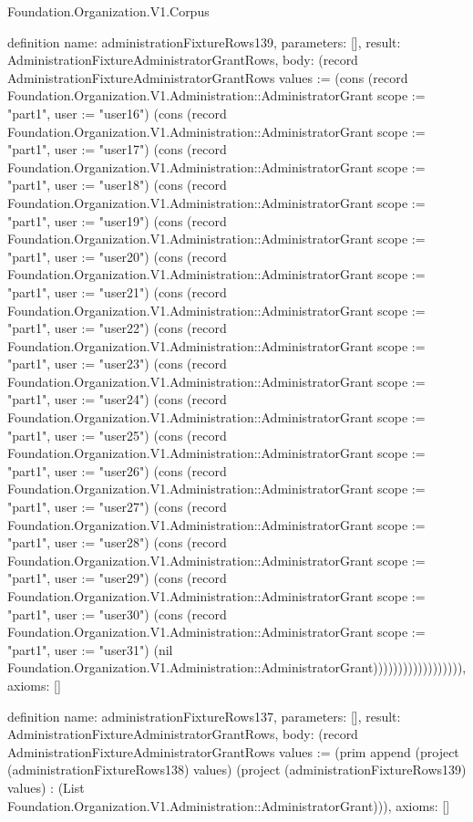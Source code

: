 \begin{lexlean}{Foundation.Organization.V1.Corpus}
\begin{semanticmodule}
definition{
  name: administrationFixtureRows139,
  parameters: [],
  result: AdministrationFixtureAdministratorGrantRows,
  body: (record AdministrationFixtureAdministratorGrantRows {values := (cons (record Foundation.Organization.V1.Administration::AdministratorGrant {scope := "part1", user := "user16"}) (cons (record Foundation.Organization.V1.Administration::AdministratorGrant {scope := "part1", user := "user17"}) (cons (record Foundation.Organization.V1.Administration::AdministratorGrant {scope := "part1", user := "user18"}) (cons (record Foundation.Organization.V1.Administration::AdministratorGrant {scope := "part1", user := "user19"}) (cons (record Foundation.Organization.V1.Administration::AdministratorGrant {scope := "part1", user := "user20"}) (cons (record Foundation.Organization.V1.Administration::AdministratorGrant {scope := "part1", user := "user21"}) (cons (record Foundation.Organization.V1.Administration::AdministratorGrant {scope := "part1", user := "user22"}) (cons (record Foundation.Organization.V1.Administration::AdministratorGrant {scope := "part1", user := "user23"}) (cons (record Foundation.Organization.V1.Administration::AdministratorGrant {scope := "part1", user := "user24"}) (cons (record Foundation.Organization.V1.Administration::AdministratorGrant {scope := "part1", user := "user25"}) (cons (record Foundation.Organization.V1.Administration::AdministratorGrant {scope := "part1", user := "user26"}) (cons (record Foundation.Organization.V1.Administration::AdministratorGrant {scope := "part1", user := "user27"}) (cons (record Foundation.Organization.V1.Administration::AdministratorGrant {scope := "part1", user := "user28"}) (cons (record Foundation.Organization.V1.Administration::AdministratorGrant {scope := "part1", user := "user29"}) (cons (record Foundation.Organization.V1.Administration::AdministratorGrant {scope := "part1", user := "user30"}) (cons (record Foundation.Organization.V1.Administration::AdministratorGrant {scope := "part1", user := "user31"}) (nil Foundation.Organization.V1.Administration::AdministratorGrant)))))))))))))))))}),
  axioms: []
}

definition{
  name: administrationFixtureRows137,
  parameters: [],
  result: AdministrationFixtureAdministratorGrantRows,
  body: (record AdministrationFixtureAdministratorGrantRows {values := (prim append (project (administrationFixtureRows138) values) (project (administrationFixtureRows139) values) : (List Foundation.Organization.V1.Administration::AdministratorGrant))}),
  axioms: []
}


\end{semanticmodule}
\end{lexlean}
